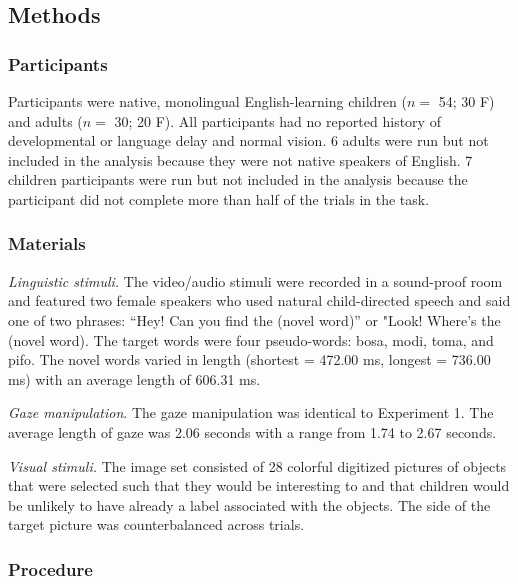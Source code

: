 \documentclass[10pt, letterpaper]{article}
\begin{document}
\hypertarget{methods-1}{%
\subsection{Methods}\label{methods-1}}

\hypertarget{participants-1}{%
\subsubsection{Participants}\label{participants-1}}

Participants were native, monolingual English-learning children (\(n=\)
54; 30 F) and adults (\(n=\) 30; 20 F). All participants had no reported
history of developmental or language delay and normal vision. 6 adults
were run but not included in the analysis because they were not native
speakers of English. 7 children participants were run but not included
in the analysis because the participant did not complete more than half
of the trials in the task.

\hypertarget{materials-1}{%
\subsubsection{Materials}\label{materials-1}}

\emph{Linguistic stimuli.} The video/audio stimuli were recorded in a
sound-proof room and featured two female speakers who used natural
child-directed speech and said one of two phrases: ``Hey! Can you find
the (novel word)'' or "Look! Where's the (novel word). The target words
were four pseudo-words: bosa, modi, toma, and pifo. The novel words
varied in length (shortest = 472.00 ms, longest = 736.00 ms) with an
average length of 606.31 ms.

\emph{Gaze manipulation}. The gaze manipulation was identical to
Experiment 1. The average length of gaze was 2.06 seconds with a range
from 1.74 to 2.67 seconds.

\emph{Visual stimuli.} The image set consisted of 28 colorful digitized
pictures of objects that were selected such that they would be
interesting to and that children would be unlikely to have already a
label associated with the objects. The side of the target picture was
counterbalanced across trials.

\hypertarget{procedure-1}{%
\subsubsection{Procedure}\label{procedure-1}}
\end{document}
